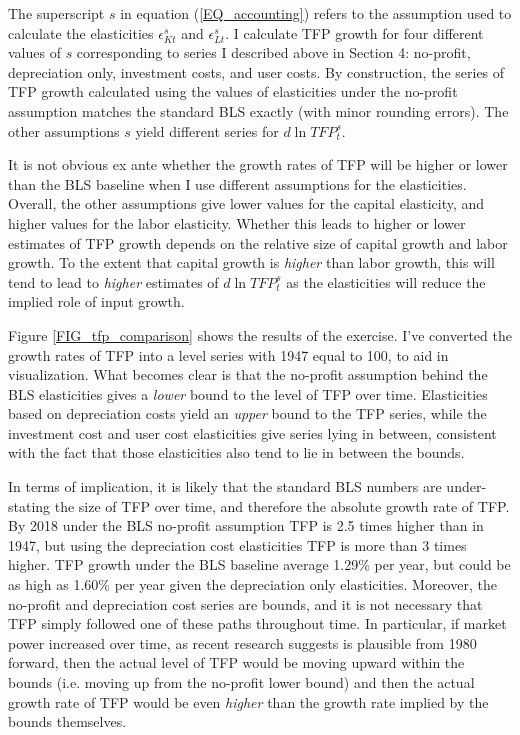 \documentclass[11pt]{article}
\begin{document}
The superscript $s$ in equation (\ref{EQ_accounting}) refers to the assumption used to calculate the elasticities $\epsilon^s_{Kt}$ and $\epsilon^s_{Lt}$. I calculate TFP growth for four different values of $s$ corresponding to series I described above in Section 4: no-profit, depreciation only, investment costs, and user costs. By construction, the series of TFP growth calculated using the values of elasticities under the no-profit assumption matches the standard BLS exactly (with minor rounding errors). The other assumptions $s$ yield different series for $d \ln TFP^s_t$.

It is not obvious ex ante whether the growth rates of TFP will be higher or lower than the BLS baseline when I use different assumptions for the elasticities. Overall, the other assumptions give lower values for the capital elasticity, and higher values for the labor elasticity. Whether this leads to higher or lower estimates of TFP growth depends on the relative size of capital growth and labor growth. To the extent that capital growth is \textit{higher} than labor growth, this will tend to lead to \textit{higher} estimates of $d \ln TFP^s_t$ as the elasticities will reduce the implied role of input growth. 

Figure \ref{FIG_tfp_comparison} shows the results of the exercise. I've converted the growth rates of TFP into a level series with 1947 equal to 100, to aid in visualization. What becomes clear is that the no-profit assumption behind the BLS elasticities gives a \textit{lower} bound to the level of TFP over time. Elasticities based on depreciation costs yield an \textit{upper} bound to the TFP series, while the investment cost and user cost elasticities give series lying in between, consistent with the fact that those elasticities also tend to lie in between the bounds. 

In terms of implication, it is likely that the standard BLS numbers are under-stating the size of TFP over time, and therefore the absolute growth rate of TFP. By 2018 under the BLS no-profit assumption TFP is 2.5 times higher than in 1947, but using the depreciation cost elasticities TFP is more than 3 times higher. TFP growth under the BLS baseline average 1.29\% per year, but could be as high as 1.60\% per year given the depreciation only elasticities. Moreover, the no-profit and depreciation cost series are bounds, and it is not necessary that TFP simply followed one of these paths throughout time. In particular, if market power increased over time, as recent research suggests is plausible from 1980 forward, then the actual level of TFP would be moving upward within the bounds (i.e. moving up from the no-profit lower bound) and then the actual growth rate of TFP would be even \textit{higher} than the growth rate implied by the bounds themselves. 
\end{document}
